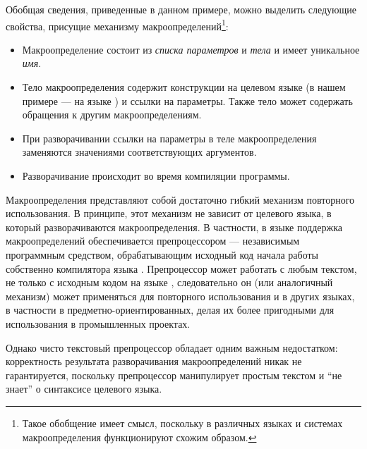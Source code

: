 Обобщая сведения, приведенные в данном примере, можно выделить следующие свойства, присущие механизму макроопределений\footnote{Такое обобщение имеет смысл, поскольку в различных языках и системах макроопределения функционируют схожим образом.}:
\begin{itemize}
\item Макроопределение состоит из \emph{списка параметров} и \emph{тела} и имеет уникальное \emph{имя}.
\item Тело макроопределения содержит конструкции на целевом языке (в нашем примере --- на языке ) и ссылки на параметры. Также тело может содержать обращения к другим макроопределениям.
\item При разворачивании ссылки на параметры в теле макроопределения заменяются значениями соответствующих аргументов.
\item Разворачивание происходит во время компиляции программы.
\end{itemize}

Макроопределения представляют собой достаточно гибкий механизм повторного использования. В принципе, этот механизм не зависит от целевого языка, в который разворачиваются макроопределения. В частности, в языке  поддержка макроопределений обеспечивается препроцессором  --- независимым программным средством, обрабатывающим исходный код  начала работы собственно компилятора языка . Препроцессор  может работать с любым текстом, не только с исходным кодом на языке , следовательно он (или аналогичный механизм) может применяться для повторного использования и в других языках, в частности в предметно-ориентированных, делая их более пригодными для использования в промышленных проектах.

Однако чисто текстовый препроцессор обладает одним важным недостатком: корректность результата разворачивания макроопределений никак не гарантируется, поскольку препроцессор манипулирует простым текстом и ``не знает'' о синтаксисе целевого языка.

